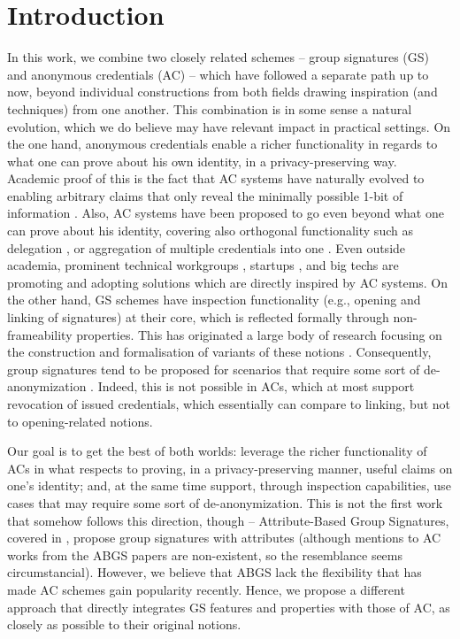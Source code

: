 \section{Introduction}
\label{sec:introduction}


In this work, we combine two closely related schemes -- group signatures (GS)
and anonymous credentials (AC) -- which have followed a
separate path up to now, beyond individual constructions from both fields
drawing inspiration (and techniques) from one another. This combination is in
some sense a natural evolution, which we do believe may have relevant impact in
practical settings. On the one hand, anonymous credentials enable a richer
functionality in regards to what one can prove about his own identity, in a
privacy-preserving way. Academic proof of this is the fact that AC systems have
naturally evolved to enabling arbitrary claims that only reveal the minimally
possible 1-bit of information \needcite. Also, AC systems have been proposed to
go even beyond what one can prove about his identity, covering also orthogonal
functionality such as delegation \needcite, or aggregation of multiple
credentials into one \needcite. Even outside academia, prominent
technical workgroups \needcite, startups \needcite, and big techs \needcite are
promoting and adopting solutions which are directly inspired by AC systems. On
the other hand, GS 
schemes have inspection functionality (e.g., opening and linking of signatures)
at their core, which is reflected formally through non-frameability properties.
This has originated a large body of research focusing on the construction and
formalisation of variants of these notions \needcite. Consequently, group
signatures tend to be proposed for scenarios that require some sort of
de-anonymization \needcite. Indeed, this is not possible in ACs, which at most
support revocation of issued credentials, which essentially can compare to
linking, but not to opening-related notions.

Our goal is to get the best of both worlds: leverage the richer functionality
of ACs in what respects to proving, in a privacy-preserving manner, useful
claims on one's identity; and, at the same time support, through inspection
capabilities, use cases that may require some sort of de-anonymization. This is
not the first work that somehow follows this direction, though --
Attribute-Based Group Signatures, covered in , propose
group signatures with attributes (although mentions to AC works from the ABGS
papers are non-existent, so the resemblance seems circumstancial). However, we
believe that ABGS lack the flexibility that has made AC schemes gain popularity
recently. Hence, we propose a different approach that directly integrates GS
features and properties with those of AC, as closely as possible to their
original notions.

